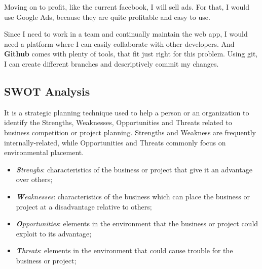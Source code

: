 \documentclass{article}
\begin{document}
			Moving on to profit, like the current facebook, I will sell ads. For that, I would use Google Ads, because they are quite profitable and easy to use.

			Since I need to work in a team and continually maintain the web app, I would need a platform where I can easily collaborate with other developers. And \textbf{Github} comes with plenty of tools, that fit just right for this problem. Using git, I can create different branches and descriptively commit my changes.

		\subsection{SWOT Analysis}
			It is a strategic planning technique used to help a person or an organization to identify the Strengths, Weaknesses, Opportunities and Threats related to business competition or project planning. Strengths and Weakness are frequently internally-related, while Opportunities and Threats commonly focus on environmental placement.

			\begin{itemize}
				\item \textit{\textbf{S}trenghs}: characteristics of the business or project that give it an advantage over others;
				\item \textit{\textbf{W}eaknesses}: characteristics of the business which can place the business or project at a disadvantage relative to others;
				\item \textit{\textbf{O}pportunities}: elements in the environment that the business or project could exploit to its advantage;
				\item \textit{\textbf{T}hreats}: elements in the environment that could cause trouble for the business or project;
			\end{itemize}
\end{document}
